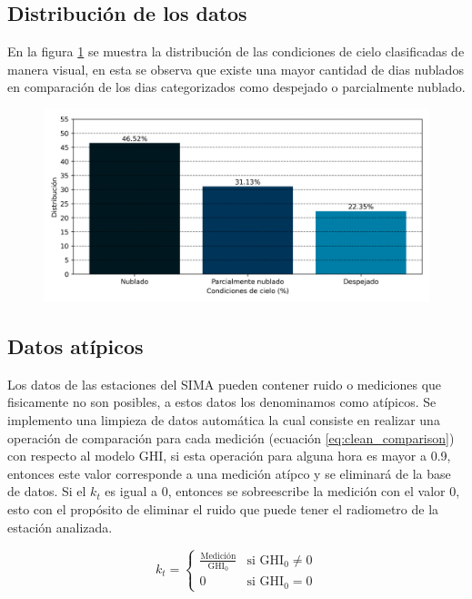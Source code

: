 \subsection{Distribución de los datos}

En la figura \ref{fig:distribution} se muestra la distribución de las condiciones de cielo clasificadas de manera visual, en esta se observa que existe una mayor cantidad de dias nublados en comparación de los dias categorizados como despejado o parcialmente nublado.

\begin{figure}[H]
	\centering
	\includegraphics[width=14cm]{Graphics/distribution_classification.png}
	\caption{}
	\label{fig:distribution}
\end{figure}

\subsection{Datos atípicos}

Los datos de las estaciones del SIMA pueden contener ruido o mediciones que fisicamente no son posibles, a estos datos los denominamos como atípicos. Se implemento una limpieza de datos automática la cual consiste en realizar una operación de comparación para cada medición (ecuación \ref{eq:clean_comparison}) con respecto al modelo GHI, si esta operación para alguna hora es mayor a 0.9, entonces este valor corresponde a una medición atípco y se eliminará de la base de datos. Si el $k_t$ es igual a 0, entonces se sobreescribe la medición con el valor 0, esto con el propósito de eliminar el ruido que puede tener el radiometro de la estación analizada.

\begin{equation}
	k_t =\begin{cases}
		\frac{\text{Medición}}{\text{GHI}_0} & \text{si GHI}_0\neq 0 \\
		0                                    & \text{si GHI}_0 = 0
	\end{cases}
	\label{eq:clean_comparison}
\end{equation}

